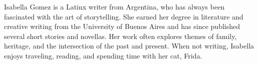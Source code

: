 Isabella Gomez is a Latinx writer from Argentina, who has always been fascinated with the art of storytelling. She earned her degree in literature and creative writing from the University of Buenos Aires and has since published several short stories and novellas. Her work often explores themes of family, heritage, and the intersection of the past and present. When not writing, Isabella enjoys traveling, reading, and spending time with her cat, Frida.

